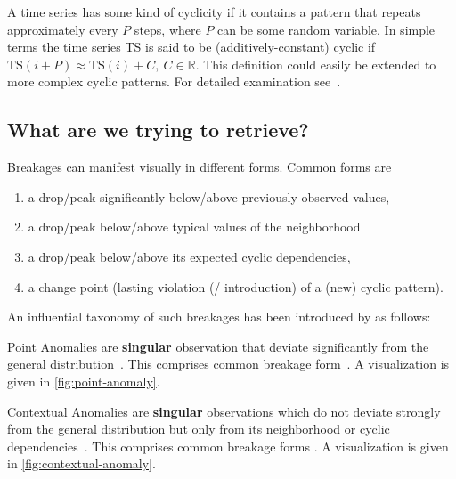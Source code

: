 \begin{definition}[Cyclicity]\label{def:cyclicity}
    A time series has some kind of cyclicity if it contains a pattern that repeats
    approximately every \(P\) steps, where \(P\) can be some random variable. In
    simple terms the time series TS is said to be (additively-constant) cyclic
    if \(\text{TS}(i + P) \approx \text{TS}(i) + C,\ C\in \mathbb{R}\). This
    definition could easily be extended to more complex cyclic patterns. For
    detailed examination see~\cite{Falk.2012}.
\end{definition}

\subsection{What are we trying to retrieve?}
Breakages can manifest visually in different forms. Common forms are
\begin{enumerate}
    \item\label{itm:1} a drop/peak significantly below/above previously observed values,
    \item\label{itm:2} a drop/peak below/above typical values of the neighborhood
    \item\label{itm:3} a drop/peak below/above its expected cyclic dependencies,
    \item\label{itm:4} a change point (lasting violation (/ introduction) of a (new) cyclic pattern).
\end{enumerate}
An influential taxonomy of such breakages has been introduced by \textcite{Chandola.2009}
as follows:

\begin{definition}\label{def:point-anomaly}
    Point Anomalies are \textbf{singular} observation that deviate significantly
    from the general distribution~\cite[cf.][]{Chandola.2009}. This comprises
    common breakage form~. A visualization is given in
    \cref{fig:point-anomaly}.
\end{definition}

\begin{definition}\label{def:contextual-anomaly}
    Contextual Anomalies are \textbf{singular} observations which do not deviate
    strongly from the general distribution but only from its neighborhood or
    cyclic dependencies~\cite[cf.][]{Chandola.2009}. This comprises common breakage
    forms . A visualization is given in
    \cref{fig:contextual-anomaly}.
\end{definition}
 
